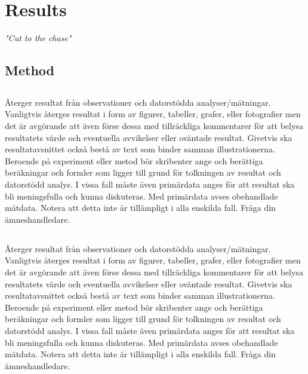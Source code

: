 \chapter{Results}
\begin{center}
\vspace{-6ex}
\textit{"Cut to the chase"}
\vspace{6ex}
\end{center}




\section{Method}
\section{}
Återger resultat från observationer och datorstödda
analyser/mätningar. Vanligtvis återges resultat i form av
figurer, tabeller, grafer, eller fotografier men det är avgörande
att även förse dessa med tillräckliga kommentarer för att belysa
resultatets värde och eventuella avvikelser eller oväntade
resultat. Givetvis ska resultatavsnittet också bestå av text som
binder samman illustrationerna.
Beroende på experiment eller metod bör skribenter ange och
berättiga beräkningar och formler som ligger till grund för
tolkningen av resultat och datorstödd analys. I vissa fall måste
även primärdata anges för att resultat ska bli meningsfulla och
kunna diskuteras. Med primärdata avses obehandlade mätdata.
Notera att detta inte är tillämpligt i alla enskilda fall. Fråga din
ämneshandledare.

\section{}
Återger resultat från observationer och datorstödda
analyser/mätningar. Vanligtvis återges resultat i form av
figurer, tabeller, grafer, eller fotografier men det är avgörande
att även förse dessa med tillräckliga kommentarer för att belysa
resultatets värde och eventuella avvikelser eller oväntade
resultat. Givetvis ska resultatavsnittet också bestå av text som
binder samman illustrationerna.
Beroende på experiment eller metod bör skribenter ange och
berättiga beräkningar och formler som ligger till grund för
tolkningen av resultat och datorstödd analys. I vissa fall måste
även primärdata anges för att resultat ska bli meningsfulla och
kunna diskuteras. Med primärdata avses obehandlade mätdata.
Notera att detta inte är tillämpligt i alla enskilda fall. Fråga din
ämneshandledare.

